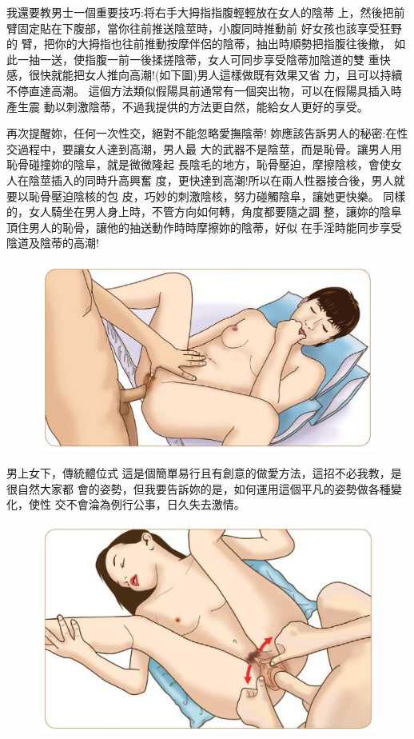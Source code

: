 \documentclass[12pt,UTF8]{ctexbook}
\begin{document}
我還要教男士一個重要技巧:将右手大拇指指腹輕輕放在女人的陰蒂
上，然後把前臂固定貼在下腹部，當你往前推送陰莖時，小腹同時推動前
好女孩也該享受狂野的
臂，把你的大拇指也往前推動按摩伴侶的陰蒂，抽出時順勢把指腹往後撤，
如此一抽一送，使指腹一前一後揉搓陰蒂，女人可同步享受陰蒂加陰道的雙
重快感，很快就能把女人推向高潮!(如下圖)男人這樣做既有效果又省
力，且可以持續不停直達高潮。
這個方法類似假陽具前通常有一個突出物，可以在假陽具插入時產生震
動以刺激陰蒂，不過我提供的方法更自然，能給女人更好的享受。

再次提醒妳，任何一次性交，絕對不能忽略愛撫陰蒂!
妳應該告訴男人的秘密:在性交過程中，要讓女人達到高潮，男人最
大的武器不是陰莖，而是恥骨。讓男人用恥骨碰撞妳的陰阜，就是微微隆起
長陰毛的地方，恥骨壓迫，摩擦陰核，會使女人在陰莖插入的同時升高興奮
度，更快達到高潮!所以在兩人性器接合後，男人就要以恥骨壓迫陰核的包
皮，巧妙的刺激陰核，努力碰觸陰阜，讓她更快樂。
同樣的，女人騎坐在男人身上時，不管方向如何轉，角度都要隨之調
整，讓妳的陰阜頂住男人的恥骨，讓他的抽送動作時時摩擦妳的陰蒂，好似
在手淫時能同步享受陰道及陰蒂的高潮!

\begin{figure}[htbp]
	\centering
	\includegraphics[width=0.7\linewidth]{27}
	\caption{}
	\label{fig:1}
\end{figure}

男上女下，傳統體位式
這是個簡單易行且有創意的做愛方法，這招不必我教，是很自然大家都
會的姿勢，但我要告訴妳的是，如何運用這個平凡的姿勢做各種變化，使性
交不會淪為例行公事，日久失去激情。

\begin{figure}[htbp]
	\centering
	\includegraphics[width=0.7\linewidth]{28}
	\caption{}
	\label{fig:1}
\end{figure}
\end{document}
